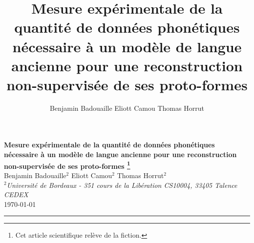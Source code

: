 \documentclass[10pt, french]{article}
\author{Benjamin Badouaille \qquad Eliott Camou \qquad Thomas Horrut}
\title{Mesure expérimentale de la quantité de données phonétiques nécessaire à un modèle
de langue ancienne pour une reconstruction non-supervisée de ses proto-formes}
\begin{document}
	\begin{center}
		{\Large \textbf{Mesure expérimentale de la quantité de données phonétiques nécessaire à un modèle de langue ancienne pour une reconstruction non-supervisée de ses proto-formes \footnote{Cet article scientifique relève de la fiction.}}}\\
		\vspace{2em}
		{\large Benjamin Badouaille$^2$ \qquad Eliott Camou$^2$ \qquad Thomas Horrut$^2$}\\
		\vspace{1em}
		\textit{$^2$Université de Bordeaux - 351 cours de la Libération CS10004, 33405 Talence     CEDEX}\\
            \vspace{1em}
            \today
	\end{center}

	\begin{center}
		\rule{150mm}{0.2mm}
	\end{center}
\end{document}
